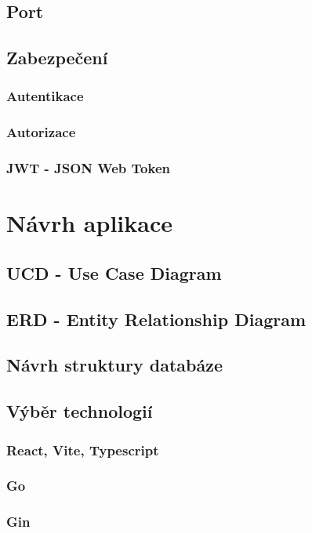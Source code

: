 \documentclass[14pt,a4paper]{article}
\begin{document}
        \subsection{Port}
        \subsection{Zabezpečení}
            \subsubsection{Autentikace}
            \subsubsection{Autorizace}
            \subsubsection{JWT - JSON Web Token}
	
	\section{Návrh aplikace}
        \subsection{UCD - Use Case Diagram}
        \subsection{ERD - Entity Relationship Diagram}
        \subsection{Návrh struktury databáze}
        \subsection{Výběr technologií}
            \subsubsection{React, Vite, Typescript}
            \subsubsection{Go}
            \subsubsection{Gin}
\end{document}
